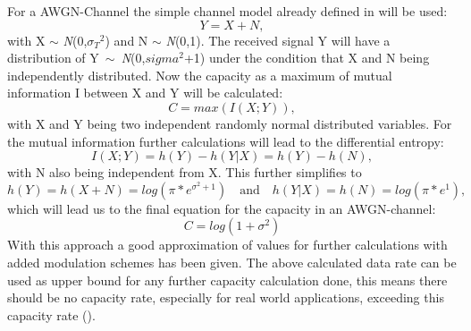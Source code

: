 For a \gls{AWGN}-Channel the simple channel model already defined in  will be used:
\begin{equation}
\label{eq:chanAWGN}
Y = X + N,   
\end{equation}
with X $\sim$ \textit{N}(0,${\sigma_{T}}^2$) and N $\sim$ \textit{N}(0,1). The received signal Y will have a distribution of \mbox{Y $\sim$ \textit{N}(0,$sigma^2$+1)} under the condition that X and N being independently distributed.
Now the capacity as a maximum of mutual information I between X and Y will be calculated:
\begin{equation}
\label{eq:cap}
C = max(I(X;Y)),     
\end{equation}
with X and Y being two independent randomly normal distributed variables.
\newline
For the mutual information further calculations will lead to the differential entropy:
\begin{equation}
I(X;Y) = h(Y) - h(Y|X)
= h(Y) - h(N),
\end{equation}
with N also being independent from X.
\newline
This further simplifies to 
\begin{equation}
h(Y) = h(X+N) = log(\pi*e^{\sigma^2+1}) \quad \textrm{and} \quad h(Y|X) = h(N) = log(\pi*e^{1}),
\end{equation}
which will lead us to the final equation for the capacity in an AWGN-channel:
\begin{equation}
\label{eq:AWGNcap}
C = log(1+\sigma^2)
\end{equation}
With this approach a good approximation of values for further calculations with added modulation schemes has been given. The above calculated data rate can be used as upper bound for any further capacity calculation done, this means there should be no capacity rate, especially for real world applications, exceeding this capacity rate ().


